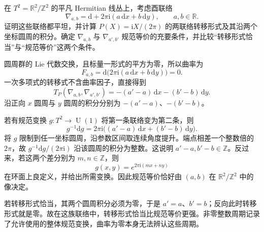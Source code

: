 \begin{exercise}\label{g2:ex:flat-torus-transgression-periods}
	在 \(T^2=\mathbb R^2/\mathbb Z^2\) 的平凡 Hermitian 线丛上，考虑酉联络
	\[
		\nabla_{a,b}=\mathrm d+2\pi\mathrm i(a\,\mathrm dx+b\,\mathrm dy),
		\qquad a,b\in\mathbb R.
	\]
	证明这些联络都平坦，并计算 \(P(X)=\mathrm iX/(2\pi)\) 的两联络转移形式及其沿两个坐标圆周的积分。确定 \(\nabla_{a,b}\) 与 \(\nabla_{a',b'}\) 规范等价的充要条件，并比较“转移形式恰当”与“规范等价”这两个条件。
\end{exercise}
\begin{solution}
	圆周群的 Lie 代数交换，且标量一形式的平方为零，所以曲率为
	\[
		F_{a,b}=\mathrm d\bigl(2\pi\mathrm i(a\,\mathrm dx+b\,\mathrm dy)\bigr)=0.
	\]
	一次多项式的转移式不含曲率因子，直接得到
	\[
		T_P(\nabla_{a,b},\nabla_{a',b'})
		=-(a'-a)\,\mathrm dx-(b'-b)\,\mathrm dy.
	\]
	沿正向 \(x\) 圆周与 \(y\) 圆周的积分分别为 \(-(a'-a)\)、\(-(b'-b)\)。

	若有规范变换 \(g:T^2\to\operatorname U(1)\) 将第一条联络变为第二条，则
	\[
		g^{-1}\mathrm dg=2\pi\mathrm i\bigl((a'-a)\,\mathrm dx+(b'-b)\,\mathrm dy\bigr).
	\]
	将 \(g\) 限制到任一坐标圆周，沿参数区间取连续角度提升。端点相差一个整数倍的 \(2\pi\)，故 \(g^{-1}\mathrm dg/(2\pi\mathrm i)\) 沿该圆周的积分为整数。这说明 \(a'-a,b'-b\in\mathbb Z\)。反过来，若这两个差分别为 \(m,n\in\mathbb Z\)，则
	\[
		g(x,y)=e^{2\pi\mathrm i(mx+ny)}
	\]
	在环面上良定义，并给出所需变换。因此规范等价恰好由 \((a,b)\) 在 \(\mathbb R^2/\mathbb Z^2\) 中的像决定。

	若转移形式恰当，其两个圆周积分必须为零，于是 \(a'=a\)、\(b'=b\)；反向此时转移形式就是零。故在这族联络中，转移形式恰当比规范等价更强。非零整数周期记录了允许使用的整体规范变换，曲率为零本身无法辨认这些周期。
\end{solution}

